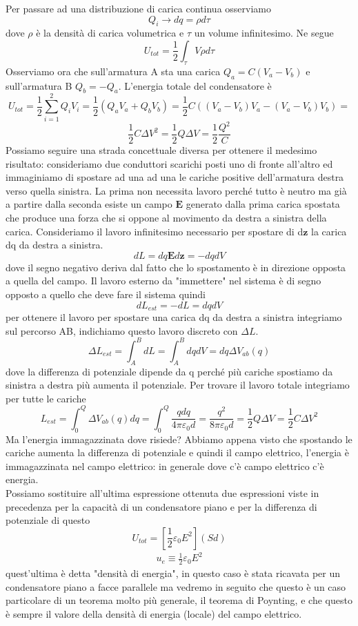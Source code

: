 \documentclass[
10pt, %
a4paper, %
oneside, %
headinclude,footinclude, %
BCOR5mm, %
]{scrartcl}
\begin{document}
Per passare ad una distribuzione di carica continua osserviamo
\[Q_i \to dq = \rho d\tau\]
dove $\rho$ è la densità di carica volumetrica e $\tau$ un volume infinitesimo. Ne segue
\[U_{tot} = \frac{1}{2}\int_{\tau} V\rho d\tau\]
Osserviamo ora che sull'armatura A sta una carica \(Q_a = C(V_a - V_b)\) e sull'armatura B \(Q_b = - Q_a\). L'energia totale del condensatore è
\[U_{tot} = \frac{1}{2}\sum_{i=1}^{2} Q_i V_i = \frac{1}{2} (Q_a V_a + Q_b V_b)= \frac{1}{2}C((V_a - V_b) V_a - (V_a - V_b) V_b) = \]
\[\frac{1}{2}C\Delta V^2 = \frac{1}{2}Q\Delta V = \frac{1}{2}\frac{Q^2}{C}\]
Possiamo seguire una strada concettuale diversa per ottenere il medesimo risultato: consideriamo due conduttori scarichi posti uno di fronte all'altro ed immaginiamo di spostare ad una ad una le cariche positive dell'armatura destra verso quella sinistra. La prima non necessita lavoro perché tutto è neutro ma già a partire dalla seconda esiste un campo $\mathbf{E}$ generato dalla prima carica spostata che produce una forza che si oppone al movimento da destra a sinistra della carica. Consideriamo il lavoro infinitesimo necessario per spostare di d$\mathbf{z}$ la carica dq da destra a sinistra. 
\[dL = dq\mathbf{E}d\mathbf{z} = -dqdV \]
dove il segno negativo deriva dal fatto che lo spostamento è in direzione opposta a quella del campo. Il lavoro esterno da "immettere" nel sistema è di segno opposto a quello che deve fare il sistema quindi
\[dL_{est} = -dL = dqdV\]
per ottenere il lavoro per spostare una carica dq da destra a sinistra integriamo sul percorso AB, indichiamo questo lavoro discreto con \(\Delta L\).
\[\Delta L_{est} = \int_{A}^{B} dL = \int_{A}^{B} dqdV = dq \Delta V_{ab}(q) \]
dove la differenza di potenziale dipende da q perché più cariche spostiamo da sinistra a destra più aumenta il potenziale. Per trovare il lavoro totale integriamo per tutte le cariche
\[L_{est} = \int_0^Q  \Delta V_{ab}(q) dq= \int_0^Q \frac{qdq}{4\pi\varepsilon_0 d} = \frac{q^2}{8\pi\varepsilon_0 d} = \frac{1}{2}Q\Delta V = \frac{1}{2} C \Delta V^2\]
Ma l'energia immagazzinata dove risiede? Abbiamo appena visto che spostando le cariche aumenta la differenza di potenziale e quindi il campo elettrico, l'energia è immagazzinata nel campo elettrico: in generale dove c'è campo elettrico c'è energia.\\
Possiamo sostituire all'ultima espressione ottenuta due espressioni viste in precedenza per la capacità di un condensatore piano e per la differenza di potenziale di questo 
\[U_{tot} = [\frac{1}{2}\varepsilon_0 E^2](Sd) \]
\begin{align}\label{eq:densità_energia_elettrica}
	u_e \equiv \frac{1}{2}\varepsilon_0 E^2
\end{align}
quest'ultima è detta "densità di energia", in questo caso è stata ricavata per un condensatore piano a facce parallele ma vedremo in seguito che questo è un caso particolare di un teorema molto più generale, il teorema di Poynting, e che questo è sempre il valore della densità di energia (locale) del campo elettrico.
\end{document}
